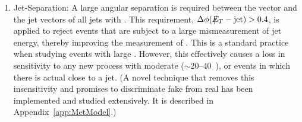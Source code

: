 \begin{singlespace}
\begin{enumerate}
\item{Jet-\met Separation: A large angular separation is required between the \met vector and the jet vectors of all jets with . This requirement, $\Delta \phi(\met - \mbox{jet})>0.4$, is applied to reject events that are subject to a large mismeasurement of jet energy, thereby improving the measurement of \met. This is a standard practice when studying events with large \met. However, this effectively causes a loss in sensitivity to any new process with moderate \met ($\sim$20--40~\etUnits), or events in which there is actual \met close to a jet. (A novel technique that removes this insensitivity and promises to discriminate fake \met from real \met has been implemented and studied extensively. It is described in Appendix~\ref{app:MetModel}.)
}
\end{enumerate}
\end{singlespace}

